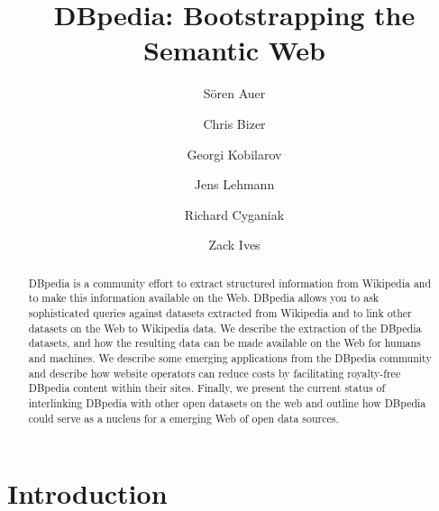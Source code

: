 \documentclass{llncs}
\begin{document}
\title{DBpedia: Bootstrapping the Semantic Web}


\author{S\"oren Auer \and Chris Bizer \and Georgi Kobilarov \and Jens Lehmann \and Richard Cyganiak \and Zack Ives}


%

\maketitle

\begin{abstract}
DBpedia is a community effort to extract structured information from Wikipedia
and to make this information available on the Web. DBpedia allows you to ask
sophisticated queries against datasets extracted from Wikipedia and to link other
datasets on the Web to Wikipedia data. We describe the extraction of the DBpedia
datasets, and how the resulting data can be made available on the Web for humans and
machines. We describe some emerging applications from the DBpedia community and describe how website operators can reduce costs by facilitating royalty-free DBpedia content within their sites. Finally, we present the current status of interlinking DBpedia with other open datasets on the web and outline how DBpedia could serve as a nucleus for a emerging Web of open data sources.
\end{abstract}

\section{Introduction}
\label{sec:introduction}
\end{document}
